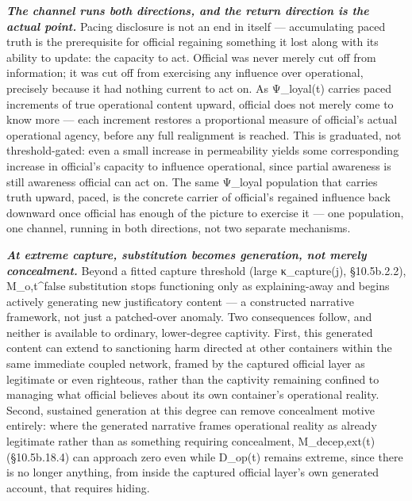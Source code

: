 \documentclass[
]{article}
\begin{document}
\emph{\textbf{The channel runs both directions, and the return direction
is the actual point.}} Pacing disclosure is not an end in itself ---
accumulating paced truth is the prerequisite for official regaining
something it lost along with its ability to update: the capacity to act.
Official was never merely cut off from information; it was cut off from
exercising any influence over operational, precisely because it had
nothing current to act on. As Ψ\_loyal(t) carries paced increments of
true operational content upward, official does not merely come to know
more --- each increment restores a proportional measure of official's
actual operational agency, before any full realignment is reached. This
is graduated, not threshold-gated: even a small increase in permeability
yields some corresponding increase in official's capacity to influence
operational, since partial awareness is still awareness official can act
on. The same Ψ\_loyal population that carries truth upward, paced, is
the concrete carrier of official's regained influence back downward once
official has enough of the picture to exercise it --- one population,
one channel, running in both directions, not two separate mechanisms.

\emph{\textbf{At extreme capture, substitution becomes generation, not
merely concealment.}} Beyond a fitted capture threshold (large
κ\_capture(j), §10.5b.2.2), M\_o,t\^{}false substitution stops
functioning only as explaining-away and begins actively generating new
justificatory content --- a constructed narrative framework, not just a
patched-over anomaly. Two consequences follow, and neither is available
to ordinary, lower-degree captivity. First, this generated content can
extend to sanctioning harm directed at other containers within the same
immediate coupled network, framed by the captured official layer as
legitimate or even righteous, rather than the captivity remaining
confined to managing what official believes about its own container's
operational reality. Second, sustained generation at this degree can
remove concealment motive entirely: where the generated narrative frames
operational reality as already legitimate rather than as something
requiring concealment, M\_decep,ext(t) (§10.5b.18.4) can approach zero
even while D\_op(t) remains extreme, since there is no longer anything,
from inside the captured official layer's own generated account, that
requires hiding.
\end{document}
